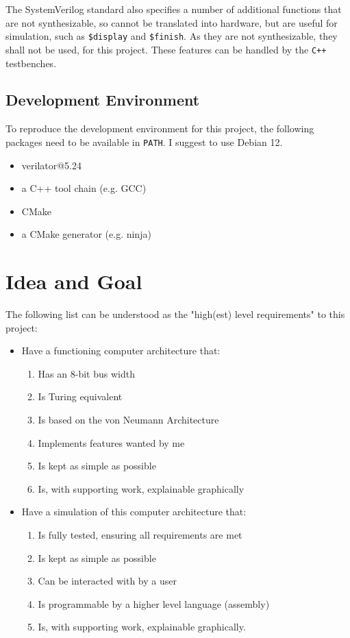 The SystemVerilog standard also specifies a number of additional functions that are not synthesizable, so cannot be translated into hardware, but are useful for simulation, such as \texttt{\$display} and \texttt{\$finish}. As they are not synthesizable, they shall not be used, for this project. These features can be handled by the \texttt{C++} testbenches.

\cite{verilogcourse}

\subsection{Development Environment}
To reproduce the development environment for this project, the following packages need to be available in \texttt{PATH}. I suggest to use Debian 12. 

\begin{itemize}
  \item verilator@5.24
  \item a C++ tool chain (e.g. GCC)
  \item CMake
  \item a CMake generator (e.g. ninja)
\end{itemize}  

\section{Idea and Goal} \label{sec:goals}  
The following list can be understood as the "high(est) level requirements" to this project:
\begin{itemize}
  \item Have a functioning computer architecture that:
 \begin{enumerate}
    \item Has an 8-bit bus width
    \item Is Turing equivalent
    \item Is based on the von Neumann Architecture
    \item Implements features wanted by me
    \item Is kept as simple as possible
    \item Is, with supporting work, explainable graphically
  \end{enumerate}
  \item Have a simulation of this computer architecture that: 
  \begin{enumerate}
    \item Is fully tested, ensuring all requirements are met
    \item Is kept as simple as possible
    \item Can be interacted with by a user
    \item Is programmable by a higher level language (assembly)
    \item Is, with supporting work, explainable graphically.
  \end{enumerate}
\end{itemize}


